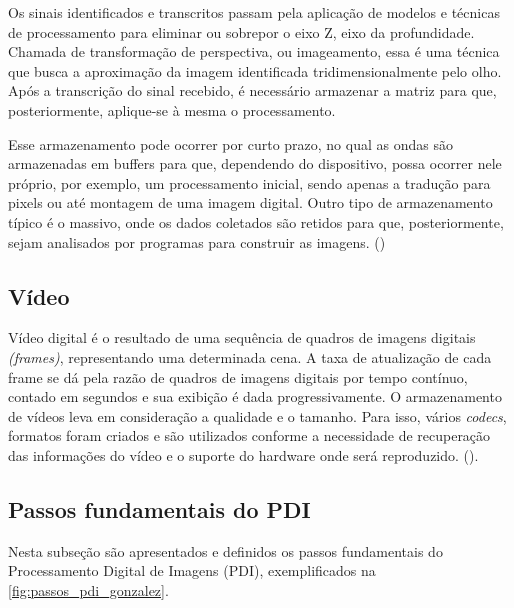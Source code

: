 \documentclass[12pt,oneside,a4paper,chapter=TITLE,section=TITLE,sumario=tradicional]{abntex2}
\begin{document}
\begin{figure}[htb]
\end{figure}

Os sinais identificados e transcritos passam pela aplicação de modelos e técnicas de processamento para eliminar ou sobrepor o eixo Z, eixo da profundidade. Chamada de transformação de perspectiva, ou imageamento, essa é uma técnica que busca a aproximação da imagem identificada tridimensionalmente pelo olho.
Após a transcrição do sinal recebido, é necessário armazenar a matriz para que, posteriormente, aplique-se à mesma o processamento.

\newline Esse armazenamento pode ocorrer por curto prazo, no qual as ondas são armazenadas em buffers para que, dependendo do dispositivo, possa ocorrer nele próprio, por exemplo, um processamento inicial, sendo apenas a tradução para pixels ou até montagem de uma imagem digital. Outro tipo de armazenamento típico é o massivo, onde os dados coletados são retidos para que, posteriormente, sejam analisados por programas para construir as imagens. ()

\subsection{Vídeo}
Vídeo digital é o resultado de uma sequência de quadros de imagens digitais \textit{(frames)}, representando uma determinada cena. A taxa de atualização de cada frame se dá pela razão de quadros de imagens digitais por tempo contínuo, contado em segundos e sua exibição é dada progressivamente.
O armazenamento de vídeos leva em consideração a qualidade e o tamanho. Para isso, vários \textit{codecs}, formatos foram criados e são utilizados conforme a necessidade de recuperação das informações do vídeo e o suporte do hardware onde será reproduzido. (\cite[p. 6]{de2013arquitetura}).

\subsection{Passos fundamentais do PDI}
Nesta subseção são apresentados e definidos os passos fundamentais do Processamento Digital de Imagens (PDI), exemplificados na \autoref{fig:passos_pdi_gonzalez}.

\begin{figure}[htb]
\end{figure}
\end{document}
